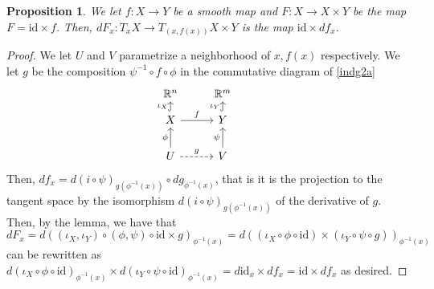 \documentclass[english]{article}
\newcommand{\RR}{\mathbb{R}}
\newtheorem*{proposition*}{Proposition}
\theoremstyle{remark}
\theoremstyle{definition}
\newcommand{\id}{\mathrm{id}}
\begin{document}
\begin{proposition*}
We let $f:X\to Y$ be a smooth map and $F:X\to X\times Y$ be the map $F=\id\times f$. Then, $dF_x:T_xX\to T_{(x,f(x))}X\times Y$ is the map $\id\times df_x$. 
\end{proposition*}
\begin{proof}
We let $U$ and $V$ parametrize a neighborhood of $x,f(x)$ respectively. We let $g$ be the composition $\psi^{-1}\circ f\circ \phi$ in the commutative diagram of \eqref{indg2a}
\begin{equation}
	\label{indg2a}
	\begin{tikzcd}[row sep=small]
	\RR^n&\RR^m\\
	X\arrow[r,"f"]\arrow[u,"\iota_X",hookrightarrow]&Y\arrow[u,"\iota_Y",hookrightarrow]\\&&\\
	U\arrow[uu,"\phi"]\arrow[r,"g",dashrightarrow]&V\arrow[uu,"\psi"]
	\end{tikzcd}
\end{equation}
Then, $df_x=d(i\circ \psi)_{g(\phi^{-1}(x))}\circ dg_{\phi^{-1}(x)}$, that is it is the projection to the tangent space by the isomorphism $d(i\circ \psi)_{g(\phi^{-1}(x))}$ of the derivative of $g$.  Then, by the lemma, we have that $dF_x=d((\iota_X,\iota_Y)\circ (\phi,\psi)\circ \id\times g)_{\phi^{-1}(x)}=d\left((\iota_X\circ \phi\circ \id)\times(\iota_Y\circ \psi\circ g)\right)_{\phi^{-1}(x)}$ can be rewritten as $d(\iota_X\circ \phi\circ \id)_{\phi^{-1}(x)}
\times d(\iota_Y\circ \psi\circ \id)_{\phi^{-1}(x)}=d\id_x\times df_x=\id\times df_x$ as desired.
\end{proof}
\end{document}
